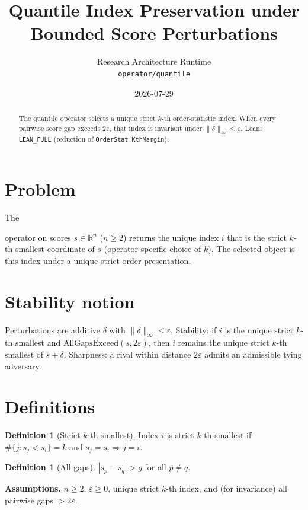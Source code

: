 \documentclass[12pt]{article}
\title{Quantile Index Preservation under Bounded Score Perturbations}
\author{Research Architecture Runtime\\[0.25em]
{\normalsize\texttt{operator/quantile}}}
\date{2026-07-29}
\theoremstyle{plain}
\theoremstyle{definition}
\newtheorem{definition}[theorem]{Definition}
\theoremstyle{remark}
\newcommand{\leanpath}[1]{%
  {\raggedright\urlstyle{tt}\path{#1}}}
\begin{document}
\maketitle

\begin{abstract}
The quantile operator selects a unique strict $k$-th order-statistic index. When every pairwise score gap exceeds $2\varepsilon$, that index is invariant under $\|\delta\|_\infty\le\varepsilon$. Lean: \texttt{LEAN\_FULL} (reduction of \texttt{OrderStat.KthMargin}).
\end{abstract}

\noindent
\begin{center}
\end{center}
\vspace{0.6em}

\section{Problem}
{\raggedright\sloppy
The \leanpath{quantile} operator on scores $s\in\mathbb{R}^n$ ($n\ge 2$) returns the unique index $i$ that is the strict $k$-th smallest coordinate of $s$ (operator-specific choice of $k$). The selected object is this index under a unique strict-order presentation.
\par}

\section{Stability notion}
Perturbations are additive $\delta$ with $\|\delta\|_\infty\le\varepsilon$. Stability: if $i$ is the unique strict $k$-th smallest and $\mathrm{AllGapsExceed}(s,2\varepsilon)$, then $i$ remains the unique strict $k$-th smallest of $s+\delta$. Sharpness: a rival within distance $2\varepsilon$ admits an admissible tying adversary.

\section{Definitions}
\begin{definition}[Strict $k$-th smallest]
Index $i$ is strict $k$-th smallest if $\#\{j:s_j<s_i\}=k$ and $s_j=s_i\Rightarrow j=i$.
\end{definition}
\begin{definition}[All-gaps]
$|s_p-s_q|>g$ for all $p\neq q$.
\end{definition}
\noindent\textbf{Assumptions.} $n\ge 2$, $\varepsilon\ge 0$, unique strict $k$-th index, and (for invariance) all pairwise gaps $>2\varepsilon$.
\end{document}
